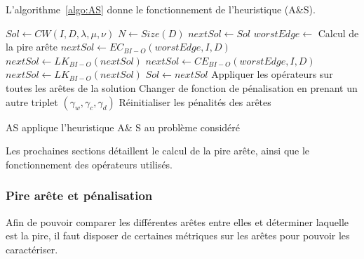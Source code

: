 \documentclass[a4paper,11pt]{article}%
\begin{document}
L'algorithme~\ref{algo:AS} donne le fonctionnement de l'heuristique (A\&S). 


\begin{algorithm}
\DontPrintSemicolon %
$Sol \gets CW(I,D,\lambda,\mu,\nu)$\;
$N \gets Size(D)$\;
$nextSol \gets Sol$\;
 {
	$worstEdge \gets$ Calcul de la pire arête\;
	$nextSol \gets EC_{BI-O}(worstEdge,I,D)$\;
	$nextSol \gets LK_{BI-O}(nextSol)$\;
	$nextSol \gets CE_{BI-O}(worstEdge,I,D)$\;
	$nextSol \gets LK_{BI-O}(nextSol)$\;
	 {
		$ Sol \gets nextSol$\;
	}
	 {
		Appliquer les opérateurs sur toutes les arêtes de la solution\;
	}
	 {
		Changer de fonction de pénalisation en prenant un autre triplet $(\gamma_w,\gamma_c,\gamma_d)$\;
	}
	 {
		Réinitialiser les pénalités des arêtes\;
	}
}
\;
\caption{{\sc AS} applique l'heuristique A\& S au problème considéré}
\label{algo:AS}
\end{algorithm}

Les prochaines sections détaillent le calcul de la pire arête, ainsi que le fonctionnement des opérateurs utilisés.


\subsubsection{Pire arête et pénalisation}
Afin de pouvoir comparer les différentes arêtes entre elles et déterminer laquelle est la pire, il faut disposer de certaines métriques sur les arêtes pour pouvoir les caractériser.
\end{document}
